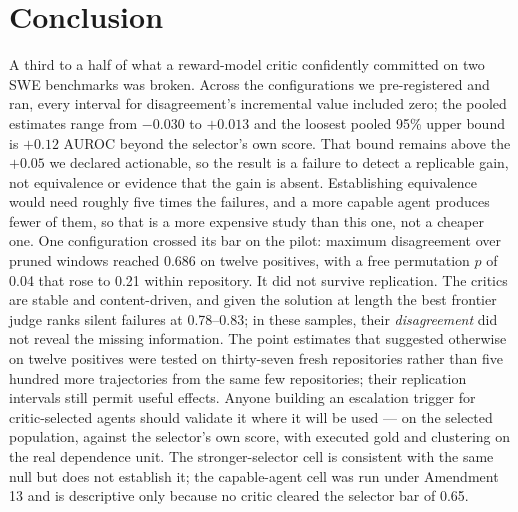 \documentclass[11pt]{article}
\begin{document}
\section{Conclusion}
A third to a half of what a reward-model critic confidently committed on two SWE benchmarks was broken. Across the configurations we pre-registered and ran, every interval for disagreement's incremental value included zero; the pooled estimates range from $-0.030$ to $+0.013$ and the loosest pooled 95\% upper bound is $+0.12$ AUROC beyond the selector's own score. That bound remains above the $+0.05$ we declared actionable, so the result is a failure to detect a replicable gain, not equivalence or evidence that the gain is absent. Establishing equivalence would need roughly five times the failures, and a more capable agent produces fewer of them, so that is a more expensive study than this one, not a cheaper one. One configuration crossed its bar on the pilot: maximum disagreement over pruned windows reached 0.686 on twelve positives, with a free permutation $p$ of 0.04 that rose to 0.21 within repository. It did not survive replication. The critics are stable and content-driven, and given the solution at length the best frontier judge ranks silent failures at 0.78--0.83; in these samples, their \emph{disagreement} did not reveal the missing information. The point estimates that suggested otherwise on twelve positives were tested on thirty-seven fresh repositories rather than five hundred more trajectories from the same few repositories; their replication intervals still permit useful effects. Anyone building an escalation trigger for critic-selected agents should validate it where it will be used --- on the selected population, against the selector's own score, with executed gold and clustering on the real dependence unit. The stronger-selector cell is consistent with the same null but does not establish it; the capable-agent cell was run under Amendment 13 and is descriptive only because no critic cleared the selector bar of 0.65.




\appendix
\end{document}

